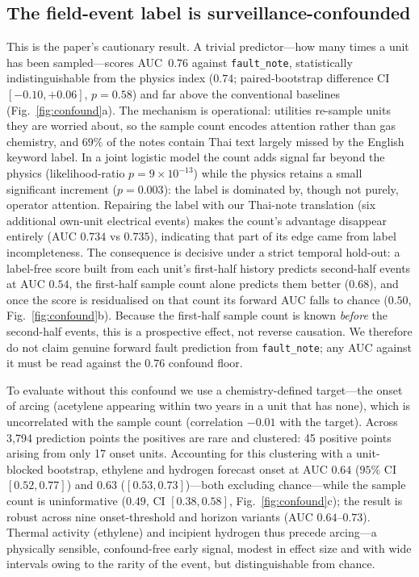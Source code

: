 \subsection{The field-event label is surveillance-confounded}
\label{subsec:confound}
This is the paper's cautionary result. A trivial predictor---how many times a unit has been
sampled---scores AUC~$\mathbf{0.76}$ against \texttt{fault\_note}, statistically
indistinguishable from the physics index ($0.74$; paired-bootstrap difference CI
$[-0.10,+0.06]$, $p=0.58$) and far above the conventional baselines (Fig.~\ref{fig:confound}a).
The mechanism is operational: utilities re-sample units they are worried about, so the sample
count encodes attention rather than gas chemistry, and $69\%$ of the notes contain Thai text
largely missed by the English keyword label. In a joint logistic model the count adds signal
far beyond the physics (likelihood-ratio $p=9\times10^{-13}$) while the physics retains a
small significant increment ($p=0.003$): the label is dominated by, though not purely, operator
attention. Repairing the label with our Thai-note translation (six additional own-unit
electrical events) makes the count's advantage disappear entirely (AUC $0.734$ vs $0.735$),
indicating that part of its edge came from label incompleteness. The consequence is decisive
under a strict temporal hold-out: a label-free score built from each unit's first-half history
predicts second-half events at AUC $0.54$, the first-half sample count alone predicts them
better ($0.68$), and once the score is residualised on that count its forward AUC falls to
chance ($0.50$, Fig.~\ref{fig:confound}b). Because the first-half sample count is known
\emph{before} the second-half events, this is a prospective effect, not reverse causation. We
therefore do not claim genuine forward fault prediction from \texttt{fault\_note}; any AUC
against it must be read against the $0.76$ confound floor.

To evaluate without this confound we use a chemistry-defined target---the onset of arcing
(acetylene appearing within two years in a unit that has none), which is uncorrelated with the
sample count (correlation $-0.01$ with the target). Across 3{,}794 prediction points the
positives are rare and clustered: 45 positive points arising from only 17 onset units.
Accounting for this clustering with a unit-blocked bootstrap, ethylene and hydrogen forecast
onset at AUC $0.64$ ($95\%$ CI $[0.52,0.77]$) and $0.63$ ($[0.53,0.73]$)---both excluding
chance---while the sample count is uninformative ($0.49$, CI $[0.38,0.58]$,
Fig.~\ref{fig:confound}c); the result is robust across nine onset-threshold and horizon variants
(AUC $0.64$--$0.73$). Thermal activity (ethylene) and incipient hydrogen thus precede
arcing---a physically sensible, confound-free early signal, modest in effect size and with wide
intervals owing to the rarity of the event, but distinguishable from chance.
